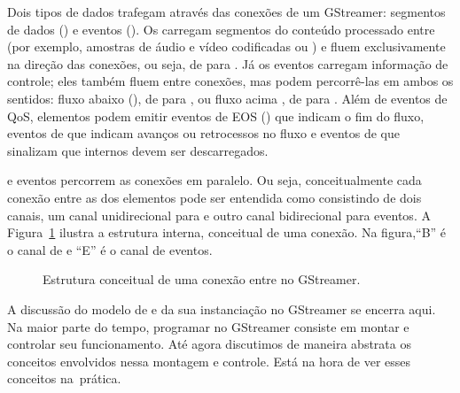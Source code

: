 \documentclass{SBCbookchapter}
\begin{document}
Dois tipos de dados trafegam através das conexões de um 
GStreamer: segmentos de dados () e eventos ().  Os
 carregam segmentos do conteúdo processado entre  (por
exemplo, amostras de áudio e vídeo codificadas ou ) e fluem
exclusivamente na direção das conexões, ou seja, de  para
.  Já os eventos carregam informação de controle; eles também
fluem entre conexões, mas podem percorrê-las em ambos os sentidos: fluxo
abaixo (), de  para , ou fluxo
acima , de  para .  Além de
eventos de QoS, elementos podem emitir eventos de EOS ()
que indicam o fim do fluxo, eventos de  que indicam avanços ou
retrocessos no fluxo e eventos de  que sinalizam que 
internos devem ser descarregados.

 e eventos percorrem as conexões em paralelo.  Ou seja,
conceitualmente cada conexão entre as  dos elementos pode ser
entendida como consistindo de dois canais, um canal unidirecional para
 e outro canal bidirecional para eventos.
A Figura~\ref{fig:conexao} ilustra a estrutura interna, conceitual de uma
conexão.  Na figura,``B'' é o canal de  e ``E'' é o canal de
eventos.

\begin{figure}[H]
  \centering
  \caption{Estrutura conceitual de uma conexão entre  no
    GStreamer.}
  \label{fig:conexao}
\end{figure}

A discussão do modelo de  e da sua instanciação no GStreamer se
encerra aqui.  Na maior parte do tempo, programar no GStreamer consiste em
montar  e controlar seu funcionamento.  Até agora discutimos
de maneira abstrata os conceitos envolvidos nessa montagem e controle.  Está
na hora de ver esses conceitos na~prática.
\end{document}

